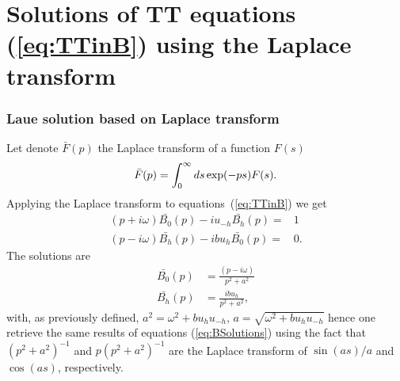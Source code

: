 \documentclass[preprint]{iucr}              %
\begin{document}
\section{Solutions of TT equations (\ref{eq:TTinB}) using the Laplace transform}
\label{appendix:laplace}


\subsubsection{Laue solution based on Laplace transform}
\label{sec:laplaceLaue}
Let denote $\bar{F}(p)$ the Laplace transform of a function $F(s)$
\begin{equation}
\Bar{F}(p) = \int_0^\infty ds \exp(-p s) F(s).
\end{equation}
Applying the Laplace transform to equations~(\ref{eq:TTinB}) we get
\begin{subequations}
\label{eq:TTlaueLaplace}
\begin{align}
(p + i \omega) \bar{B_0}(p) - i u_{-h} \bar{B_h}(p)= & 1 \\
(p - i \omega) \bar{B_h}(p) - i b u_{h} \bar{B_0}(p)= & 0.
\end{align}
\end{subequations}
The solutions are
\begin{subequations}
\begin{align}
\bar{B_0}(p) &= \frac{(p - i \omega) }{p^2 + a^2} \\
\bar{B_h}(p) &= \frac{i b u_h}{p^2 + a^2},
\end{align}
\end{subequations}
with, as previously defined, $a^2=\omega^2 + b u_h u_{-h}$, $a=\sqrt{\omega^2+b u_h u_{-h}}$
hence one retrieve the same results of equations (\ref{eq:BSolutions}) using the fact that  $(p^2+a^2)^{-1}$ and $p(p^2+a^2)^{-1}$ are the Laplace transform of $\sin(a s)/a$ and $\cos(a s)$, respectively. 
\end{document}
